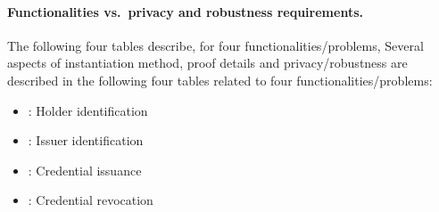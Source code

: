 
\newcommand{\begminB}[1]{\begmin{#1}\setlist[itemize]{leftmargin=1.5ex}\renewcommand{\labelitemi}{-}}

\newenvironment{funcprivtabular}[3]{\begin{center}%
		\renewcommand{\thelinenumber}{}\footnotesize
		\begin{edtable}{tabular}{%
			|>{\begminB{#1}}l<{\myendmini}|%
			>{\begminB{#2}}l<{\myendmini}|%
			>{\begminB{#3}}l|}
		}{\end{edtable}\vspace{1em}\end{center}}



\paragraph{Functionalities vs.\ privacy and robustness requirements.}


	The following four tables describe, for four functionalities/problems, 
	Several aspects of instantiation method, proof details and privacy/robustness are described in the 
following four tables related to four functionalities/problems:
\begin{itemize}
\item {}: Holder identification
\item {}: Issuer identification
\item {}: Credential issuance
\item {}: Credential revocation
\end{itemize}



